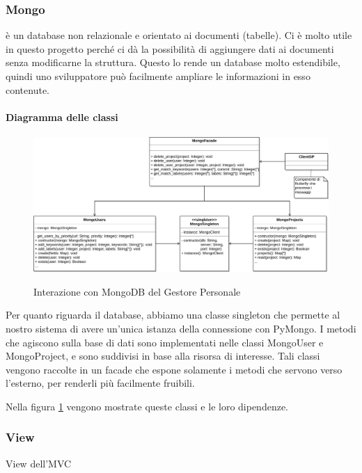 \subsubsection{Mongo}
 è un database non relazionale e orientato ai documenti (tabelle). Ci è molto utile in questo progetto perché ci dà la possibilità di aggiungere dati ai documenti senza modificarne la struttura.
Questo lo rende un database molto estendibile, quindi uno sviluppatore può facilmente ampliare le informazioni in esso contenute.

    \paragraph{Diagramma delle classi}

    \begin{figure}[H]
        \centering
        \includegraphics[width=\textwidth]{img/GP-Mongo.png}\\
        \caption{Interazione con MongoDB del Gestore Personale}
        \label{fig:GP-Mongo}
    \end{figure}

    Per quanto riguarda il database, abbiamo una classe singleton che permette al nostro sistema di avere un'unica istanza della connessione con PyMongo.
    I metodi che agiscono sulla base di dati sono implementati nelle classi MongoUser e MongoProject, e sono suddivisi in base alla risorsa di interesse.
    Tali classi vengono raccolte in un facade che espone solamente i metodi che servono verso l’esterno, per renderli più facilmente fruibili. \par
    Nella figura \ref{fig:GP-Mongo} vengono mostrate queste classi e le loro dipendenze.


\subsubsection{View}
View dell'MVC

